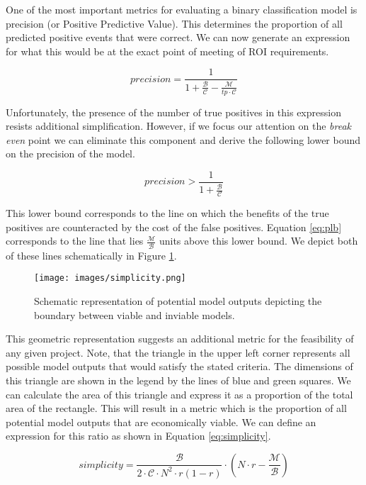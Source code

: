 \documentclass[11pt,a4paper]{article}
\begin{document}
One of the most important metrics for evaluating a binary classification model is precision (or Positive Predictive Value). This determines
the proportion of all predicted positive events that were correct. We can now generate an expression for what this would
be at the exact point of meeting of ROI requirements.

\begin{equation}
\label{eq:plb}
precision = \frac{1}{1 + \frac{\mathcal{B}}{\mathcal{C}} - \frac{\mathcal{M}}{tp \cdot \mathcal{C}}}
\end{equation}

Unfortunately, the presence of the number of true positives in this expression resists additional simplification.
However, if we focus our attention on the \textit{break even} point we can eliminate this component and derive the
following lower bound on the precision of the model.


\begin{equation}
precision > \frac{1}{1 + \frac{\mathcal{B}}{\mathcal{C}} }
\end{equation}

This lower bound corresponds to the line on which the benefits of the true positives are counteracted by the cost of the false positives.
Equation \ref{eq:plb} corresponds to the line that lies $\frac{\mathcal{M}}{\mathcal{B}}$ units above this lower bound.
We depict both of these lines schematically in Figure \ref{fig:simplicity}.

\begin{figure}[h!]
\texttt{[image: images/simplicity.png]}
\caption{Schematic representation of potential model outputs depicting the boundary between viable and inviable models.}
\label{fig:simplicity}
\end{figure}

This geometric representation suggests an additional metric for the feasibility of any given project.
Note, that the triangle in the upper left corner represents all possible model outputs that would satisfy
the stated criteria. The dimensions of this triangle are shown in the legend by the lines of blue and green squares.
We can calculate the area of this triangle and express it as a proportion of the total area of the
rectangle. 
This will result in a metric which is the proportion of all potential
model outputs that are economically viable.
We can define an expression for this ratio as shown in Equation \ref{eq:simplicity}.

\begin{equation}
simplicity = \frac{\mathcal{B}}{2 \cdot \mathcal{C} \cdot N^2 \cdot r(1-r)} \cdot  \left(N \cdot r - \frac{\mathcal{M}}{\mathcal{B}} \right)
\label{eq:simplicity}
\end{equation}
\end{document}
